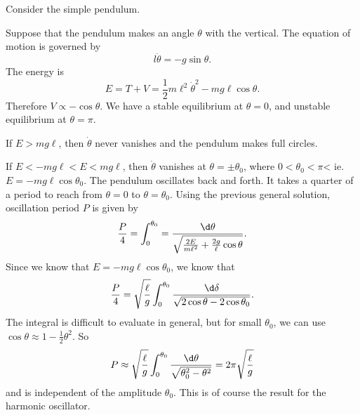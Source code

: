 \documentclass[a4paper]{article}
\begin{document}
\begin{eg}
  Consider the simple pendulum.
  \begin{center}
  \end{center}
  Suppose that the pendulum makes an angle $\theta$ with the vertical. The equation of motion is governed by
  \[
    l\ddot{\theta} = -g\sin \theta.
  \]
  The energy is
  \[
    E = T + V = \frac{1}{2}m\ell^2 \dot{\theta}^2 - mg\ell \cos\theta.
  \]
  Therefore $V\propto -\cos\theta$. We have a stable equilibrium at $\theta = 0 $, and unstable equilibrium at $\theta = \pi$.
  \begin{center}
  \end{center}
  If $E > mg\ell$, then $\dot{\theta}$ never vanishes and the pendulum makes full circles.
  
  If $E < -mg\ell < E < mg\ell$, then $\dot{\theta}$ vanishes at $\theta = \pm \theta_0$, where $0 < \theta_0 < \pi$< ie. $E = -mg\ell \cos\theta_0$. The pendulum oscillates back and forth. It takes a quarter of a period to reach from $\theta = 0$ to $\theta = \theta_0$. Using the previous general solution, oscillation period $P$ is given by
  \[
    \frac{P}{4} = \int_0^{\theta_0} = \frac{\d \theta}{\sqrt{\frac{2E}{m\ell^2} + \frac{2g}{\ell }\cos\theta}}.
  \]
  Since we know that $E = -mg\ell \cos \theta_0$, we know that
  \[
    \frac{P}{4} = \sqrt{\frac{\ell}{g}}\int_0^{\theta_0} \frac{\d \delta}{\sqrt{2\cos\theta - 2\cos\theta_0}}.
  \]
  The integral is difficult to evaluate in general, but for small $\theta_0$, we can use $\cos\theta \approx 1 - \frac{1}{2}\theta^2$. So
  \[
    P \approx \sqrt{\frac{\ell}{g}}\int_0^{\theta_0}\frac{\d \theta}{\sqrt{\theta_0^2 - \theta^2}} = 2\pi\sqrt{\frac{\ell}{g}}
  \]
  and is independent of the amplitude $\theta_0$. This is of course the result for the harmonic oscillator. 
\end{eg}
\end{document}
